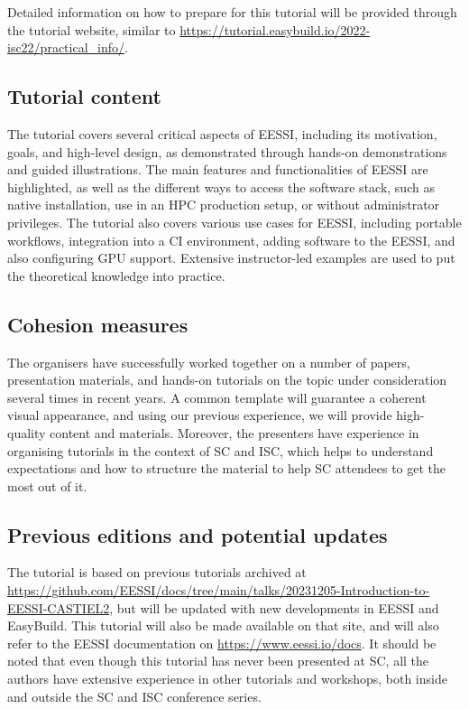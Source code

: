 Detailed information on how to prepare for this tutorial will be provided
through the tutorial website, similar to
\url{https://tutorial.easybuild.io/2022-isc22/practical_info/}.

\subsection*{Tutorial content}
The tutorial covers several critical aspects of EESSI, including its motivation, goals, and high-level design, as
demonstrated through hands-on demonstrations and guided illustrations. The main features and functionalities of EESSI
are highlighted, as well as the different ways to access the software stack, such as native installation, use in an HPC
production setup, or without administrator privileges. The tutorial also covers various use cases for EESSI, including
portable workflows, integration into a CI environment, adding software to the EESSI, and also configuring GPU support.
Extensive instructor-led examples are used to put the theoretical knowledge into practice.

\subsection*{Cohesion measures}
The organisers have successfully worked together on a number of papers, presentation materials,
and hands-on tutorials on the topic under consideration several times in recent years.
A common template
will guarantee
a coherent visual appearance, and using our previous experience, we will provide high-quality content and materials.
Moreover, the presenters have experience in organising tutorials in the context of SC and ISC, which helps to understand
expectations
and how to structure the material
to help SC attendees to get the most out of it.

\subsection*{Previous editions and potential updates}
The tutorial is based on previous tutorials archived at
\url{https://github.com/EESSI/docs/tree/main/talks/20231205-Introduction-to-EESSI-CASTIEL2},
but will be updated with new developments in EESSI and EasyBuild.
This tutorial will also be made available on that site, and will also refer to the EESSI documentation on
\url{https://www.eessi.io/docs}.
It should be noted that even though this tutorial has never been presented at SC, all the authors have extensive
experience in other tutorials and workshops, both inside and outside the SC and ISC conference series.